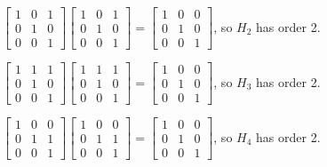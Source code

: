 \documentclass[12pt,letterpaper]{article}
\begin{document}
\begin{enumerate}
\begin{enumerate}
          $
            \begin{bmatrix}
              1 & 0 & 1 \\
              0 & 1 & 0 \\
              0 & 0 & 1
            \end{bmatrix}
            \begin{bmatrix}
              1 & 0 & 1 \\
              0 & 1 & 0 \\
              0 & 0 & 1
            \end{bmatrix}
            =
            \begin{bmatrix}
              1 & 0 & 0 \\
              0 & 1 & 0 \\
              0 & 0 & 1
            \end{bmatrix}
          $, so $H_2$ has order 2.

          $
            \begin{bmatrix}
              1 & 1 & 1 \\
              0 & 1 & 0 \\
              0 & 0 & 1
            \end{bmatrix}
            \begin{bmatrix}
              1 & 1 & 1 \\
              0 & 1 & 0 \\
              0 & 0 & 1
            \end{bmatrix}
            =
            \begin{bmatrix}
              1 & 0 & 0 \\
              0 & 1 & 0 \\
              0 & 0 & 1
            \end{bmatrix}
          $, so $H_3$ has order 2.

          $
            \begin{bmatrix}
              1 & 0 & 0 \\
              0 & 1 & 1 \\
              0 & 0 & 1
            \end{bmatrix}
            \begin{bmatrix}
              1 & 0 & 0 \\
              0 & 1 & 1 \\
              0 & 0 & 1
            \end{bmatrix}
            =
            \begin{bmatrix}
              1 & 0 & 0 \\
              0 & 1 & 0 \\
              0 & 0 & 1
            \end{bmatrix}
          $, so $H_4$ has order 2.


\end{enumerate}
\end{enumerate}
\end{document}
